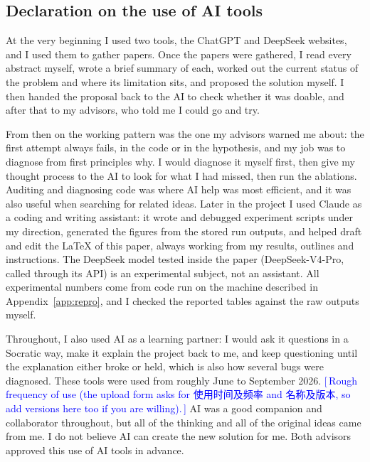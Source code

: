 \documentclass[10pt]{article}
\theoremstyle{definition}
\newcommand{\needwrite}[1]{\textcolor{blue}{[\,#1\,]}}
\begin{document}
\subsection*{Declaration on the use of AI tools}

At the very beginning I used two tools, the ChatGPT and DeepSeek
websites, and I used them to gather papers. Once the papers were
gathered, I read every abstract myself, wrote a brief summary of each,
worked out the current status of the problem and where its limitation
sits, and proposed the solution myself. I then handed the proposal back
to the AI to check whether it was doable, and after that to my advisors,
who told me I could go and try.

From then on the working pattern was the one my advisors warned me about:
the first attempt always fails, in the code or in the hypothesis, and my
job was to diagnose from first principles why. I would diagnose it myself
first, then give my thought process to the AI to look for what I had
missed, then run the ablations.
Auditing and diagnosing code was where AI help was most efficient, and it
was also useful when searching for related ideas. Later in the project I
used Claude as a coding and writing assistant: it wrote and debugged
experiment scripts under my direction, generated the figures from the
stored run outputs, and helped draft and edit the LaTeX of this paper,
always working from my results, outlines and instructions. The DeepSeek
model tested inside the paper (DeepSeek-V4-Pro, called through its API)
is an experimental subject, not an assistant. All experimental numbers
come from code run on the machine described in Appendix~\ref{app:repro},
and I checked the reported tables against the raw outputs myself.

Throughout, I also used AI as a learning partner: I would ask it
questions in a Socratic way, make it explain the project back to me, and
keep questioning until the explanation either broke or held, which is also
how several bugs were diagnosed. These tools were used from roughly June
to September 2026.
\needwrite{Rough frequency of use (the upload form asks for 使用时间及频率
and 名称及版本, so add versions here too if you are willing).} AI was a
good companion and collaborator throughout, but all of the thinking and
all of the original ideas came from me. I do not believe AI can create the
new solution for me.
Both advisors approved this use of AI tools in advance.
\end{document}
